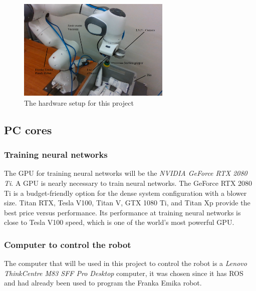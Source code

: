 \begin{figure}[h]
    \centering
    \includegraphics[width = 0.65\textwidth]{graphics/setup.jpg}
    \caption{The hardware setup for this project}
    \label{fig:setupproject}
\end{figure}
\linespread{0}
\subsection{PC cores}
\vspace{0.8cm}
\subsubsection*{Training neural networks}
The GPU for training neural networks will be the \textit{NVIDIA GeForce RTX 2080 Ti}\cite{noauthor_graphics_nodate}.
A GPU is nearly necessary to train neural networks. The GeForce RTX 2080 Ti is a budget-friendly option for the dense system configuration with a blower size. Titan RTX, Tesla V100, Titan V, GTX 1080 Ti, and Titan Xp provide the best price versus performance. Its performance at training neural networks is close to Tesla V100 speed, which is one of the world's most powerful GPU\cite{noauthor_deep_2018}. 

\subsubsection*{Computer to control the robot}
The computer that will be used in this project to control the robot is a \textit{Lenovo ThinkCentre M83 SFF Pro Desktop}\cite{noauthor_thinkcentre_nodate} computer, it was chosen since it has ROS and had already been used to program the Franka Emika robot. 

\clearpage

